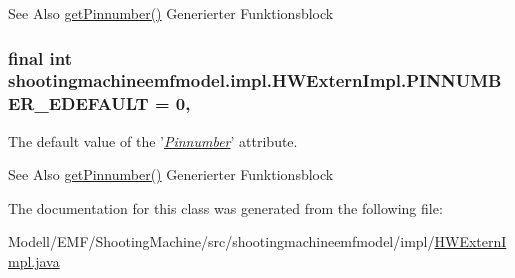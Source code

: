 \begin{DoxySeeAlso}{See Also}
\hyperlink{classshootingmachineemfmodel_1_1impl_1_1_h_w_extern_impl_a86c10c1bc44b1145a93323d6b4abff06}{get\-Pinnumber()} Generierter Funktionsblock  
\end{DoxySeeAlso}
\hypertarget{classshootingmachineemfmodel_1_1impl_1_1_h_w_extern_impl_af4354e697c47eb82e78b978093aca7eb}{
\subsubsection[{P\-I\-N\-N\-U\-M\-B\-E\-R\-\_\-\-E\-D\-E\-F\-A\-U\-L\-T}]{\setlength{\rightskip}{0pt plus 5cm}final int shootingmachineemfmodel.\-impl.\-H\-W\-Extern\-Impl.\-P\-I\-N\-N\-U\-M\-B\-E\-R\-\_\-\-E\-D\-E\-F\-A\-U\-L\-T = 0\hspace{0.3cm}{\ttfamily [static]}, {\ttfamily [protected]}}}\label{classshootingmachineemfmodel_1_1impl_1_1_h_w_extern_impl_af4354e697c47eb82e78b978093aca7eb}
The default value of the '\hyperlink{classshootingmachineemfmodel_1_1impl_1_1_h_w_extern_impl_a86c10c1bc44b1145a93323d6b4abff06}{{\itshape Pinnumber}}' attribute.

\begin{DoxySeeAlso}{See Also}
\hyperlink{classshootingmachineemfmodel_1_1impl_1_1_h_w_extern_impl_a86c10c1bc44b1145a93323d6b4abff06}{get\-Pinnumber()} Generierter Funktionsblock  
\end{DoxySeeAlso}


The documentation for this class was generated from the following file\-:\begin{DoxyCompactItemize}
\item 
Modell/\-E\-M\-F/\-Shooting\-Machine/src/shootingmachineemfmodel/impl/\hyperlink{_h_w_extern_impl_8java}{H\-W\-Extern\-Impl.\-java}\end{DoxyCompactItemize}
